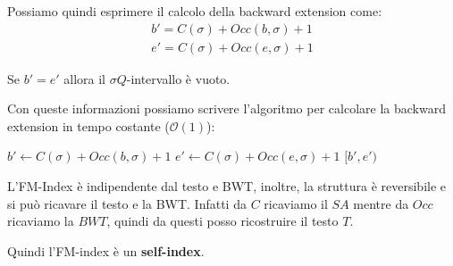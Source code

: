 Possiamo quindi esprimere il calcolo della backward extension come:
\begin{equation}
    \begin{array}{c}
        b' = C(\sigma) + Occ(b, \sigma) + 1 \\
        e' = C(\sigma) + Occ(e, \sigma) + 1
    \end{array}
\end{equation}
\begin{nota}
    Se $b' = e'$ allora il $\sigma Q$-intervallo è vuoto.
\end{nota}
Con queste informazioni possiamo scrivere l'algoritmo per calcolare la backward
extension in tempo costante ($\mathcal{O}(1)$):
\begin{algorithm}
    \begin{algorithmic}
        \State $b' \gets C(\sigma) + Occ(b, \sigma) + 1$
        \State $e' \gets C(\sigma) + Occ(e, \sigma) + 1$
        \State \Return $[b', e')$
        \EndFunction
    \end{algorithmic}
\end{algorithm}
\begin{nota}
    L'FM-Index è indipendente dal testo e BWT, inoltre, la struttura è
    reversibile e si può ricavare il testo e la BWT. Infatti da $C$ ricaviamo il
    $SA$ mentre da $Occ$ ricaviamo la $BWT$, quindi da questi posso ricostruire
    il testo $T$.

    Quindi l'FM-index è un \textbf{self-index}.
\end{nota}
